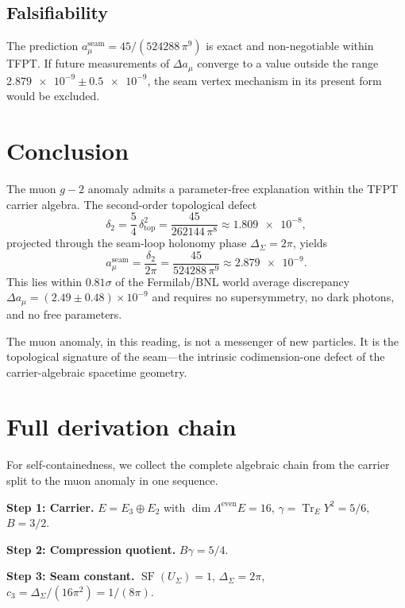 \documentclass[11pt,a4paper]{article}
\theoremstyle{definition}
\theoremstyle{remark}
\DeclareMathOperator{\tr}{Tr}
\DeclareMathOperator{\SF}{SF}
\newcommand{\Seam}{\Sigma}
\newcommand{\cthree}{c_3}
\newcommand{\deltatop}{\delta_{\mathrm{top}}}
\newcommand{\gammaY}{\gamma}
\numberwithin{equation}{section}
\begin{document}
\subsection{Falsifiability}

The prediction $a_\mu^{\mathrm{seam}}=45/(524288\,\pi^9)$ is exact and
non-negotiable within TFPT. If future measurements of $\Delta a_\mu$ converge
to a value outside the range $\num{2.879e-9}\pm\num{0.5e-9}$, the seam
vertex mechanism in its present form would be excluded.

\section{Conclusion}\label{sec:conclusion}

The muon $g-2$ anomaly admits a parameter-free explanation within the
TFPT carrier algebra. The second-order topological defect
\[
\delta_2
=
\frac54\,\deltatop^2
=
\frac{45}{262144\,\pi^8}
\approx\num{1.809e-8},
\]
projected through the seam-loop holonomy phase $\Delta_\Seam=2\pi$, yields
\[
\boxed{
a_\mu^{\mathrm{seam}}
=
\frac{\delta_2}{2\pi}
=
\frac{45}{524288\,\pi^9}
\approx\num{2.879e-9}.
}
\]
This lies within $0.81\sigma$ of the Fermilab/BNL world average discrepancy
$\Delta a_\mu=(2.49\pm0.48)\times10^{-9}$ and requires no supersymmetry, no
dark photons, and no free parameters.

The muon anomaly, in this reading, is not a messenger of new particles. It
is the topological signature of the seam---the intrinsic codimension-one
defect of the carrier-algebraic spacetime geometry.

\appendix

\section{Full derivation chain}\label{app:chain}

For self-containedness, we collect the complete algebraic chain from the
carrier split to the muon anomaly in one sequence.

\medskip

\textbf{Step 1: Carrier.}
$E=E_3\oplus E_2$ with $\dim\Lambda^{\mathrm{even}}E=16$,\quad
$\gammaY=\tr_EY^2=5/6$,\quad $B=3/2$.

\textbf{Step 2: Compression quotient.}
$B\gammaY=5/4$.

\textbf{Step 3: Seam constant.}
$\SF(U_\Seam)=1$, $\Delta_\Seam=2\pi$,
$\cthree=\Delta_\Seam/(16\pi^2)=1/(8\pi)$.
\end{document}
